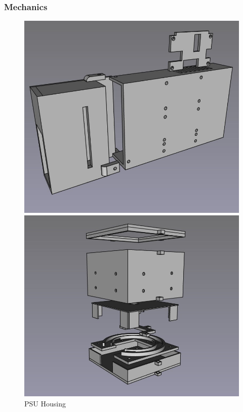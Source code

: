 \subsubsection{Mechanics} \label{sec:mechanics}
\begin{figure}
    \begin{minipage}[t]{0.32\textwidth}
      \centering
      \includegraphics[width=\textwidth]{imgs/freecad/psu_mount.jpg}
      \caption{PSU Housing}
    \end{minipage}
    \hfill
    \begin{minipage}[t]{0.32\textwidth}
      \centering
      \includegraphics[width=\textwidth]{imgs/freecad/camera_case.jpg}

\end{minipage}
\end{figure}
